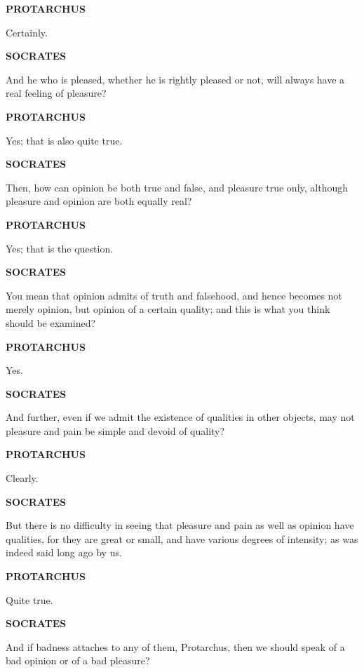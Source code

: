 \documentclass[11pt,letter]{article}
\begin{document}
\par \textbf{PROTARCHUS}
\par   Certainly.

\par \textbf{SOCRATES}
\par   And he who is pleased, whether he is rightly pleased or not, will always have a real feeling of pleasure?

\par \textbf{PROTARCHUS}
\par   Yes; that is also quite true.

\par \textbf{SOCRATES}
\par   Then, how can opinion be both true and false, and pleasure true only, although pleasure and opinion are both equally real?

\par \textbf{PROTARCHUS}
\par   Yes; that is the question.

\par \textbf{SOCRATES}
\par   You mean that opinion admits of truth and falsehood, and hence becomes not merely opinion, but opinion of a certain quality; and this is what you think should be examined?

\par \textbf{PROTARCHUS}
\par   Yes.

\par \textbf{SOCRATES}
\par   And further, even if we admit the existence of qualities in other objects, may not pleasure and pain be simple and devoid of quality?

\par \textbf{PROTARCHUS}
\par   Clearly.

\par \textbf{SOCRATES}
\par   But there is no difficulty in seeing that pleasure and pain as well as opinion have qualities, for they are great or small, and have various degrees of intensity; as was indeed said long ago by us.

\par \textbf{PROTARCHUS}
\par   Quite true.

\par \textbf{SOCRATES}
\par   And if badness attaches to any of them, Protarchus, then we should speak of a bad opinion or of a bad pleasure?
\end{document}
